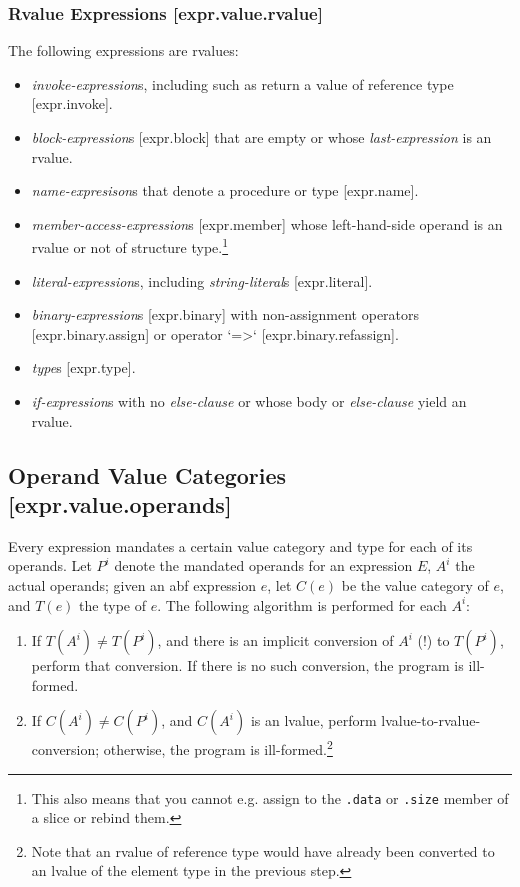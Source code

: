 \documentclass[a4paper, 12pt, oneside, final]{article}
\def\sref[#1]{[#1]}
\begin{document}
\subsubsection{Rvalue Expressions [expr.value.rvalue]}
The following expressions are rvalues:
\begin{itemize}
\item \emph{invoke-expression}s, including such as return a value of reference type \sref[expr.invoke].
\item \emph{block-expression}s \sref[expr.block] that are empty or whose \emph{last-expression} is an rvalue.
\item \emph{name-expresison}s that denote a procedure or type \sref[expr.name].
\item \emph{member-access-expression}s \sref[expr.member] whose left-hand-side operand is an rvalue or not of structure type.\footnote{This
      also means that you cannot e.g. assign to the \texttt{.data} or \texttt{.size} member of a slice or rebind them.}
\item \emph{literal-expression}s, including \emph{string-literal}s \sref[expr.literal].
\item \emph{binary-expression}s \sref[expr.binary] with non-assignment operators \sref[expr.binary.assign] or operator `=>` \sref[expr.binary.refassign].
\item \emph{type}s \sref[expr.type].
\item \emph{if-expression}s with no \emph{else-clause} or whose body or \emph{else-clause} yield an rvalue.
\end{itemize}

\subsection{Operand Value Categories [expr.value.operands]}
Every expression mandates a certain value category and type for each of its operands. Let $P^i$ denote the mandated
operands for an expression $E$, $A^i$ the actual operands; given an abf expression $e$, let $C(e)$ be the value category of $e$, and $T(e)$ the type
of $e$. The following algorithm is performed for each $A^i$:
\begin{enumerate}
\item If $T(A^i) \neq T(P^i)$, and there is an implicit conversion of $A^i$ (!) to $T(P^i)$, perform that conversion.
      If there is no such conversion, the program is ill-formed.
\item If $C(A^i) \neq C(P^i)$, and $C(A^i)$ is an lvalue, perform lvalue-to-rvalue-conversion; otherwise, the program
      is ill-formed.\footnote{Note that an rvalue of reference type would have already been converted to an lvalue of
      the element type in the previous step.}
\end{enumerate}
\end{document}
